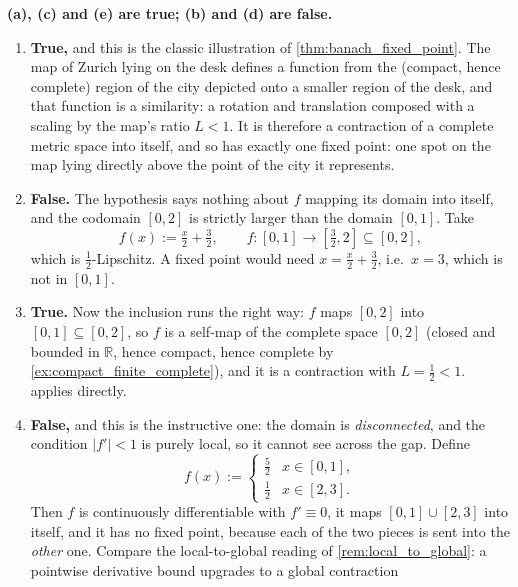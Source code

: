 \begin{exercisesolution}
\label{sol:fixed_points_multiple_choice}
\textbf{(a), (c) and (e) are true; (b) and (d) are false.}

\begin{enumerate}[label=\textbf{(\alph*)}]
  \item \textbf{True,} and this is the classic illustration of \cref{thm:banach_fixed_point}. The
    map of Zurich lying on the desk defines a function from the (compact, hence complete) region
    of the city depicted onto a smaller region of the desk, and that function is a similarity: a
    rotation and translation composed with a scaling by the map's ratio $L < 1$. It is therefore
    a contraction of a complete metric space into itself, and so has exactly one fixed point: one
    spot on the map lying directly above the point of the city it represents.
  \item \textbf{False.} The hypothesis says nothing about $f$ mapping its domain into itself, and
    the codomain $[0,2]$ is strictly larger than the domain $[0,1]$. Take
    \[f(x) := \tfrac{x}{2} + \tfrac32, \qquad f : [0,1] \to [\tfrac32,2] \subseteq [0,2],\]
    which is $\tfrac12$-Lipschitz. A fixed point would need $x = \tfrac x2 + \tfrac32$, i.e.\
    $x=3$, which is not in $[0,1]$.
  \item \textbf{True.} Now the inclusion runs the right way: $f$ maps $[0,2]$ into
    $[0,1] \subseteq [0,2]$, so $f$ is a self-map of the complete space $[0,2]$
    (closed and bounded in $\mathbb{R}$, hence compact, hence complete by
    \cref{ex:compact_finite_complete}), and it is a contraction with $L = \tfrac12 < 1$.
    \Cref{thm:banach_fixed_point} applies directly.
  \item \textbf{False,} and this is the instructive one: the domain is \emph{disconnected}, and
    the condition $|f'| < 1$ is purely local, so it cannot see across the gap. Define
    \[f(x) := \begin{cases} \tfrac52 & x \in [0,1], \\ \tfrac12 & x \in [2,3].\end{cases}\]
    Then $f$ is continuously differentiable with $f' \equiv 0$, it maps
    $[0,1]\cup[2,3]$ into itself, and it has no fixed point, because each of the two pieces is
    sent into the \emph{other} one. Compare the local-to-global reading of
    \cref{rem:local_to_global}: a pointwise derivative bound upgrades to a global contraction

\end{enumerate}
\end{exercisesolution}
